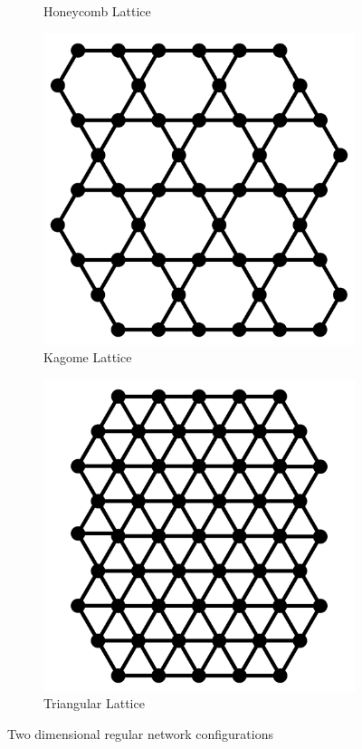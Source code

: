 \begin{figure}[p]
\begin{subfigure}[b]{0.45\textwidth}
    \caption{Honeycomb Lattice}
    \label{fig:honeycomb lattice}
  \end{subfigure}
  \hfill
  \begin{subfigure}[b]{0.45\textwidth}
    \centering
    \includegraphics[width=\textwidth]{2/Kagome}
    \caption{Kagome Lattice}
    \label{fig:kagome lattice}
  \end{subfigure}
  \hfill
  \begin{subfigure}[b]{0.45\textwidth}
    \centering
    \includegraphics[width=\textwidth]{2/Triangular}
    \caption{Triangular Lattice}
    \label{fig:triangular lattice}
  \end{subfigure}
  \caption{Two dimensional regular network configurations}
  \label{fig:two dimensional networks}
\end{figure}

